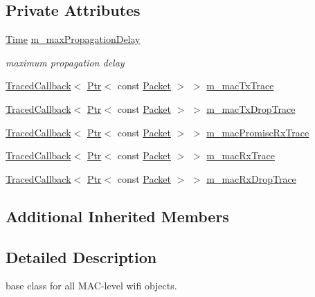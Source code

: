 \subsection*{Private Attributes}
\begin{DoxyCompactItemize}
\item 
\hyperlink{classns3_1_1Time}{Time} \hyperlink{classns3_1_1WifiMac_a2f809d4b50f8a46eed67c464ac7a930d}{m\+\_\+max\+Propagation\+Delay}
\begin{DoxyCompactList}\small\item\em maximum propagation delay \end{DoxyCompactList}\item 
\hyperlink{classns3_1_1TracedCallback}{Traced\+Callback}$<$ \hyperlink{classns3_1_1Ptr}{Ptr}$<$ const \hyperlink{classns3_1_1Packet}{Packet} $>$ $>$ \hyperlink{classns3_1_1WifiMac_a57a7609a3453d7f8bb45990edca1811e}{m\+\_\+mac\+Tx\+Trace}
\item 
\hyperlink{classns3_1_1TracedCallback}{Traced\+Callback}$<$ \hyperlink{classns3_1_1Ptr}{Ptr}$<$ const \hyperlink{classns3_1_1Packet}{Packet} $>$ $>$ \hyperlink{classns3_1_1WifiMac_a8d28777a4c6f2a8c7514f0c6f93da79e}{m\+\_\+mac\+Tx\+Drop\+Trace}
\item 
\hyperlink{classns3_1_1TracedCallback}{Traced\+Callback}$<$ \hyperlink{classns3_1_1Ptr}{Ptr}$<$ const \hyperlink{classns3_1_1Packet}{Packet} $>$ $>$ \hyperlink{classns3_1_1WifiMac_aadb7693e9a6c397391c48a90b6773976}{m\+\_\+mac\+Promisc\+Rx\+Trace}
\item 
\hyperlink{classns3_1_1TracedCallback}{Traced\+Callback}$<$ \hyperlink{classns3_1_1Ptr}{Ptr}$<$ const \hyperlink{classns3_1_1Packet}{Packet} $>$ $>$ \hyperlink{classns3_1_1WifiMac_a89965d25d0d4b93890534e2dd2a31e2f}{m\+\_\+mac\+Rx\+Trace}
\item 
\hyperlink{classns3_1_1TracedCallback}{Traced\+Callback}$<$ \hyperlink{classns3_1_1Ptr}{Ptr}$<$ const \hyperlink{classns3_1_1Packet}{Packet} $>$ $>$ \hyperlink{classns3_1_1WifiMac_aaacf17caeadb826164ee3efbc87fecd5}{m\+\_\+mac\+Rx\+Drop\+Trace}
\end{DoxyCompactItemize}
\subsection*{Additional Inherited Members}


\subsection{Detailed Description}
base class for all M\+A\+C-\/level wifi objects.

